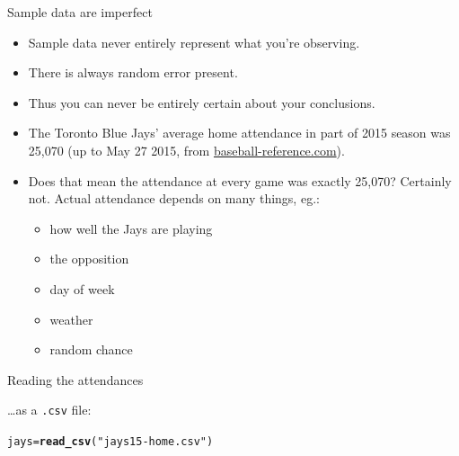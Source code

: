 \documentclass[unknownkeysallowed]{beamer}\usepackage[]{graphicx}\usepackage[]{color}
\makeatletter
\newcommand{\hlstr}[1]{\textcolor[rgb]{0.192,0.494,0.8}{#1}}%
\newcommand{\hlstd}[1]{\textcolor[rgb]{0.345,0.345,0.345}{#1}}%
\newcommand{\hlkwb}[1]{\textcolor[rgb]{0.69,0.353,0.396}{#1}}%
\newcommand{\hlkwd}[1]{\textcolor[rgb]{0.737,0.353,0.396}{\textbf{#1}}}%
\newenvironment{kframe}{%
 \def\at@end@of@kframe{}%
 \ifinner\ifhmode%
  \def\at@end@of@kframe{\end{minipage}}%
  \begin{minipage}{\columnwidth}%
 \fi\fi%
 \def\FrameCommand##1{\hskip\@totalleftmargin \hskip-\fboxsep
 \colorbox{shadecolor}{##1}\hskip-\fboxsep
     \hskip-\linewidth \hskip-\@totalleftmargin \hskip\columnwidth}%
 \MakeFramed {\advance\hsize-\width
   \@totalleftmargin\z@ \linewidth\hsize
   \@setminipage}}%
 {\par\unskip\endMakeFramed%
 \at@end@of@kframe}
\newenvironment{knitrout}{}{} %
\makeatother
\begin{document}
\begin{frame}[fragile]{Sample data are imperfect}
  
  \begin{itemize}
  \item Sample data never entirely represent what you're observing.
  \item There is always random error present.
  \item Thus you can never be entirely certain about your conclusions.
  \item The Toronto Blue Jays' average home attendance in part of 2015
    season was 25,070
    (up to May 27 2015, from \url{baseball-reference.com}).
  \item Does that mean the attendance at every game was exactly
    25,070? Certainly not. Actual attendance depends on many things, eg.:
    \begin{itemize}
    \item how well the Jays are playing
    \item the opposition
    \item day of week
    \item weather
    \item random chance
    \end{itemize}
  \end{itemize}
  
\end{frame}

\begin{frame}[fragile]{Reading the attendances}

\ldots as a \texttt{.csv} file:

\begin{knitrout}
\color{fgcolor}\begin{kframe}
\begin{alltt}
\hlstd{jays}\hlkwb{=}\hlkwd{read_csv}\hlstd{(}\hlstr{"jays15-home.csv"}\hlstd{)}
\end{alltt}


{\ttfamily\noindent\itshape{}}

{\ttfamily\noindent\itshape\color{messagecolor}{\#\# See spec(...) for full column specifications.}}\end{kframe}
\end{knitrout}
  
\end{frame}
\end{document}
